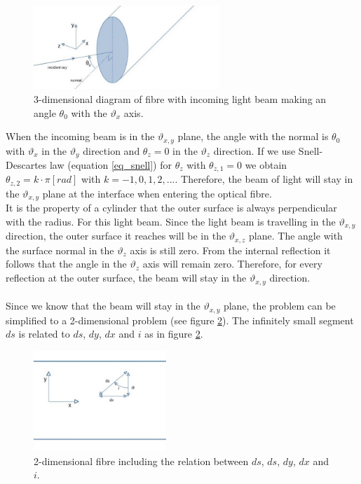 \documentclass{article}
\begin{document}
\begin{figure}[h!]
	\centering
	\includegraphics[width=7cm]{afbeeldingen/fibre_3d.jpg}
	\caption{3-dimensional diagram of fibre with incoming light beam making an angle $\theta _0$ with the $\vartheta _x$ axis.}
	\label{fig_fibre_3d}
\end{figure}

When the incoming beam is in the $\vartheta _{x,y}$ plane, the angle with the normal is $\theta _0$ with $\vartheta _x$ in the $\vartheta _y$ direction and $\theta _z = 0$ in the $\vartheta _z$ direction. If we use Snell-Descartes law (equation \ref{eq_snell}) for $\theta _z$ with $\theta _{z,1} = 0$ we obtain $\theta _{z,2} = k \cdot \pi [rad]$ with $k = -1,0,1,2,...$. Therefore, the beam of light will stay in the $\vartheta _{x,y}$ plane at the interface when entering the optical fibre. \\
It is the property of a cylinder that the outer surface is always perpendicular with the radius. For this light beam. Since the light beam is travelling in the $\vartheta _{x,y}$ direction, the outer surface it reaches will be in the $\vartheta _{x,z}$ plane. The angle with the surface normal in the $\vartheta _z$ axis is still zero. From the internal reflection it follows that the angle in  the $\vartheta _z$ axis will remain zero. Therefore, for every reflection at the outer surface, the beam will stay in the $\vartheta _{x,y}$ direction.\\
\\ 
Since we know that the beam will stay in the $\vartheta _{x,y}$ plane, the problem can  be simplified to a 2-dimensional problem (see figure \ref{fig_fibre_2d}). The infinitely small segment $ds$ is related to $ds$, $dy$, $dx$ and $i$ as in figure \ref{fig_fibre_2d}. 

\begin{figure}[h!]
	\centering
	\includegraphics[width = 5cm]{afbeeldingen/fibre_2d.jpg}
	\caption{2-dimensional fibre including the relation between $ds$, $ds$, $dy$, $dx$ and $i$.}
	\label{fig_fibre_2d}
\end{figure}
\end{document}
